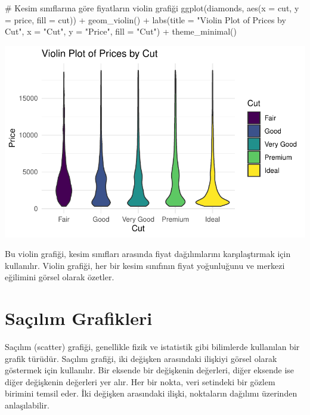 \documentclass[
  letterpaper,
  DIV=11,
  numbers=noendperiod]{scrreprt}
\newenvironment{Shaded}{\begin{snugshade}}{\end{snugshade}}
\newcommand{\AttributeTok}[1]{\textcolor[rgb]{0.40,0.45,0.13}{#1}}
\newcommand{\CommentTok}[1]{\textcolor[rgb]{0.37,0.37,0.37}{#1}}
\newcommand{\FunctionTok}[1]{\textcolor[rgb]{0.28,0.35,0.67}{#1}}
\newcommand{\NormalTok}[1]{\textcolor[rgb]{0.00,0.23,0.31}{#1}}
\newcommand{\SpecialCharTok}[1]{\textcolor[rgb]{0.37,0.37,0.37}{#1}}
\newcommand{\StringTok}[1]{\textcolor[rgb]{0.13,0.47,0.30}{#1}}
\begin{document}
\begin{Shaded}
\begin{Highlighting}[]
\CommentTok{\# Kesim sınıflarına göre fiyatların violin grafiği}
\FunctionTok{ggplot}\NormalTok{(diamonds, }\FunctionTok{aes}\NormalTok{(}\AttributeTok{x =}\NormalTok{ cut, }\AttributeTok{y =}\NormalTok{ price, }\AttributeTok{fill =}\NormalTok{ cut)) }\SpecialCharTok{+}
  \FunctionTok{geom\_violin}\NormalTok{() }\SpecialCharTok{+}
  \FunctionTok{labs}\NormalTok{(}\AttributeTok{title =} \StringTok{"Violin Plot of Prices by Cut"}\NormalTok{,}
       \AttributeTok{x =} \StringTok{"Cut"}\NormalTok{,}
       \AttributeTok{y =} \StringTok{"Price"}\NormalTok{,}
       \AttributeTok{fill =} \StringTok{"Cut"}\NormalTok{) }\SpecialCharTok{+}
  \FunctionTok{theme\_minimal}\NormalTok{()}
\end{Highlighting}
\end{Shaded}

\includegraphics{ggplot2_files/figure-pdf/unnamed-chunk-9-1.pdf}

Bu violin grafiği, kesim sınıfları arasında fiyat dağılımlarını
karşılaştırmak için kullanılır. Violin grafiği, her bir kesim sınıfının
fiyat yoğunluğunu ve merkezi eğilimini görsel olarak özetler.

\section*{Saçılım Grafikleri}\label{sauxe7ux131lux131m-grafikleri}


Saçılım (scatter) grafiği, genellikle fizik ve istatistik gibi
bilimlerde kullanılan bir grafik türüdür. Saçılım grafiği, iki değişken
arasındaki ilişkiyi görsel olarak göstermek için kullanılır. Bir eksende
bir değişkenin değerleri, diğer eksende ise diğer değişkenin değerleri
yer alır. Her bir nokta, veri setindeki bir gözlem birimini temsil eder.
İki değişken arasındaki ilişki, noktaların dağılımı üzerinden
anlaşılabilir.
\end{document}
